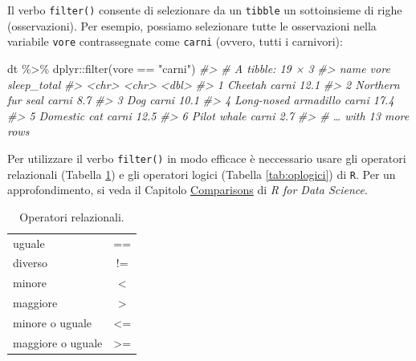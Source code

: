 \documentclass[
  10pt,
  italian,
  a4paper,
  extrafontsizes,onecolumn,openright
  ]{memoir}
\newenvironment{Shaded}{\begin{snugshade}}{\end{snugshade}}
\newcommand{\CommentTok}[1]{\textcolor[rgb]{0.56,0.35,0.01}{\textit{#1}}}
\newcommand{\FunctionTok}[1]{\textcolor[rgb]{0.00,0.00,0.00}{#1}}
\newcommand{\NormalTok}[1]{#1}
\newcommand{\SpecialCharTok}[1]{\textcolor[rgb]{0.00,0.00,0.00}{#1}}
\newcommand{\StringTok}[1]{\textcolor[rgb]{0.31,0.60,0.02}{#1}}
\begin{document}
Il verbo \texttt{filter()} consente di selezionare da un \texttt{tibble} un sottoinsieme di righe (osservazioni). Per esempio, possiamo selezionare tutte le osservazioni nella variabile \texttt{vore} contrassegnate come \texttt{carni} (ovvero, tutti i carnivori):

\begin{Shaded}
\begin{Highlighting}[]
\NormalTok{dt }\SpecialCharTok{\%\textgreater{}\%}
\NormalTok{  dplyr}\SpecialCharTok{::}\FunctionTok{filter}\NormalTok{(vore }\SpecialCharTok{==} \StringTok{"carni"}\NormalTok{)}
\CommentTok{\#\textgreater{} \# A tibble: 19 × 3}
\CommentTok{\#\textgreater{}   name                 vore  sleep\_total}
\CommentTok{\#\textgreater{}   \textless{}chr\textgreater{}                \textless{}chr\textgreater{}       \textless{}dbl\textgreater{}}
\CommentTok{\#\textgreater{} 1 Cheetah              carni        12.1}
\CommentTok{\#\textgreater{} 2 Northern fur seal    carni         8.7}
\CommentTok{\#\textgreater{} 3 Dog                  carni        10.1}
\CommentTok{\#\textgreater{} 4 Long{-}nosed armadillo carni        17.4}
\CommentTok{\#\textgreater{} 5 Domestic cat         carni        12.5}
\CommentTok{\#\textgreater{} 6 Pilot whale          carni         2.7}
\CommentTok{\#\textgreater{} \# … with 13 more rows}
\end{Highlighting}
\end{Shaded}

Per utilizzare il verbo \texttt{filter()} in modo efficace è neccessario usare gli operatori relazionali (Tabella \ref{tab:oprelazionali}) e gli operatori logici (Tabella \ref{tab:oplogici}) di \texttt{R}. Per un approfondimento, si veda il Capitolo \href{https://r4ds.had.co.nz/transform.html}{Comparisons} di \emph{R for Data Science}.

\begin{table}[h!]
  \begin{center}
    \caption{Operatori relazionali.}
    \label{tab:oprelazionali}
    \begin{tabular}{l c} 
      \toprule
      uguale             &  == \\
      diverso            &  !=  \\
      minore             &  <  \\
      maggiore           &  >  \\
      minore o uguale      & <=  \\
      maggiore o uguale  & >=  \\
      \bottomrule
    \end{tabular}
  \end{center}
\end{table}
\end{document}
